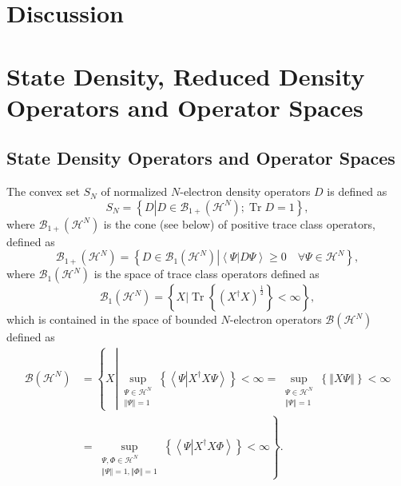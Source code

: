 \documentclass[aps,preprint]{revtex4}%
\begin{document}
\section{Discussion\label{Discussion}}

\appendix


\section{State Density, Reduced Density Operators and Operator Spaces
\label{Denmat}}

\subsection{State Density Operators and Operator Spaces}

The convex set $S_{N}$ of normalized $N$-electron density operators $D$ is
defined as
\begin{equation}
S_{N}=\left\{  D\left\vert D\in\mathcal{B}_{1+}\left(  \mathcal{H}^{N}\right)
;\operatorname{Tr}D=1\right.  \right\}  ,
\end{equation}
where $\mathcal{B}_{1+}\left(  \mathcal{H}^{N}\right)  $ is the cone (see
below) of positive trace class operators, defined as
\begin{equation}
\mathcal{B}_{1+}\left(  \mathcal{H}^{N}\right)  =\left\{  D\in\mathcal{B}%
_{1}\left(  \mathcal{H}^{N}\right)  \left\vert \overset{}{\left\langle
\Psi\left\vert D\Psi\right.  \right\rangle }\geq0\quad\forall\Psi
\in\mathcal{H}^{N}\right.  \right\}  ,
\end{equation}
where $\mathcal{B}_{1}\left(  \mathcal{H}^{N}\right)  $ is the space of trace
class operators defined as
\begin{equation}
\mathcal{B}_{1}\left(  \mathcal{H}^{N}\right)  =\left\{  \left.  X\right\vert
\operatorname{Tr}\left\{  \left(  X^{\dagger}X\right)  ^{\frac{1}{2}}\right\}
<\infty\right\}  ,
\end{equation}
which is contained in the space of bounded $N$-electron operators
$\mathcal{B}\left(  \mathcal{H}^{N}\right)  $ defined as
\begin{align}
\mathcal{B}\left(  \mathcal{H}^{N}\right)   &  =\left\{  X\left\vert
\sup_{\substack{\Psi\in\mathcal{H}^{N}\\\left\Vert \Psi\right\Vert
=1}}\left\{  \left\langle \Psi\left\vert X^{\dagger}X\Psi\right.
\right\rangle \right\}  <\infty=\sup_{\substack{\Psi\in\mathcal{H}%
^{N}\\\left\Vert \Psi\right\Vert =1}}\left\{  \left\Vert X\Psi\right\Vert
\right\}  <\infty\right.  \right. \\
&  =\left.  \sup_{\substack{\Psi,\Phi\in\mathcal{H}^{N}\\\left\Vert
\Psi\right\Vert =1,\left\Vert \Phi\right\Vert =1}}\left\{  \left\langle
\Psi\left\vert X^{\dagger}X\Phi\right.  \right\rangle \right\}  <\infty
\right\}  .
\end{align}
\end{document}
